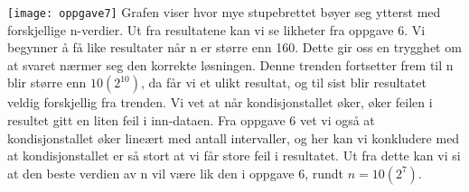 \texttt{[image: oppgave7]}
Grafen viser hvor mye stupebrettet bøyer seg ytterst med forskjellige n-verdier. Ut fra resultatene kan vi se likheter fra oppgave 6. Vi begynner å få like resultater når n er større enn 160. Dette gir oss en trygghet om at svaret nærmer seg den korrekte løsningen. Denne trenden fortsetter frem til n blir større enn $10(2^10)$, da får vi et ulikt resultat, og til sist blir resultatet veldig forskjellig fra trenden. Vi vet at når kondisjonstallet øker, øker feilen i resultet gitt en liten feil i inn-dataen. Fra oppgave 6 vet vi også at kondisjonstallet øker lineært med antall intervaller, og her kan vi konkludere med at kondisjonstallet er så stort at vi får store feil i resultatet. Ut fra dette kan vi si at den beste verdien av n vil være lik den i oppgave 6, rundt $n = 10(2^7)$.